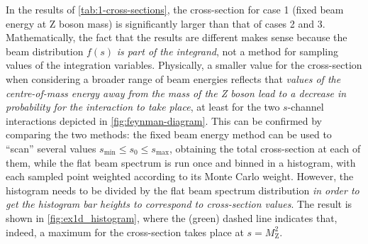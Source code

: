 In the results of \autoref{tab:1-cross-sections}, the cross-section for case 1 (fixed beam energy at Z boson mass) is significantly larger than that of cases 2 and 3. Mathematically, the fact that the results are different makes sense because the beam distribution $f(s)$ \emph{is part of the integrand}, not a method for sampling values of the integration variables. Physically, a smaller value for the cross-section when considering a broader range of beam energies reflects that  \emph{values of the centre-of-mass energy away from the mass of the \emph{Z} boson lead to a decrease in probability for the interaction to take place}, at least for the two $s$-channel interactions depicted in \autoref{fig:feynman-diagram}. This can be confirmed by comparing the two methods: the fixed beam energy method can be used to “scan” several values $s_{\text{min}} \leq s_{0} \leq s_{\text{max}}$, obtaining the total cross-section at each of them, while the flat beam spectrum is run once and binned in a histogram, with each sampled point weighted according to its Monte Carlo weight.  However, the histogram needs to be divided by the flat beam spectrum distribution \emph{in order to get the histogram bar heights to correspond to cross-section values}. The result is shown in \autoref{fig:ex1d_histogram}, where the (green) dashed line indicates that, indeed, a maximum for the cross-section takes place at $s = M_{\mathrm{Z}}^{2}$.

